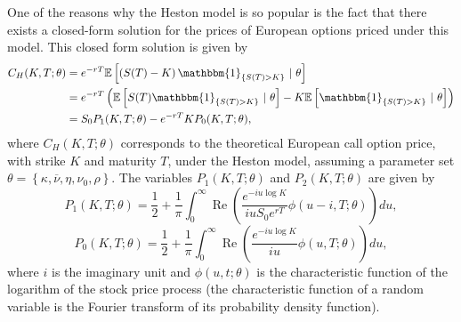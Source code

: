 One of the reasons why the Heston model is so popular is the fact that there exists a closed-form solution for the prices of European options priced under this model. This closed form solution is given by
\begin{equation}\label{CH}
\begin{split}
C_{H}(K,T;\theta)&=e^{-rT}\mathbb{E}\left[\left(S(T)-K\right)\mathbbm{1}_{\left\{S(T)>K\right\}}\ \vert\ \theta\right]\\
&=e^{-rT}\left(\mathbb{E}\left[S(T)\mathbbm{1}_{\left\{S(T)>K\right\}}\ \vert\ \theta\right]-K\mathbb{E}\left[\mathbbm{1}_{\left\{S(T)>K\right\}}\ \vert\ \theta\right]\right)\\
&=S_0P_1(K,T;\theta)-e^{-rT}KP_0(K,T;\theta),
\end{split}
\end{equation}
\noindent where $C_{H}(K,T;\theta)$ corresponds to the theoretical European call option price, with strike $K$ and maturity $T$, under the Heston model, assuming a parameter set $\theta=\left\{\kappa,\overline{\nu},\eta,\nu_0,\rho\right\}$. The variables $P_1(K,T;\theta)$ and $P_2(K,T;\theta)$ are given by
\begin{equation}\label{P1}
P_1(K,T;\theta)=\frac{1}{2}+\frac{1}{\pi}\int_0^\infty\operatorname{Re}\left(\frac{e^{-iu\log K}}{iuS_0e^{rT}}\phi(u-i,T;\theta)\right)du,
\end{equation}
\begin{equation}\label{P2}
P_0(K,T;\theta)=\frac{1}{2}+\frac{1}{\pi}\int_0^\infty\operatorname{Re}\left(\frac{e^{-iu\log K}}{iu}\phi(u,T;\theta)\right)du,
\end{equation}
\noindent where $i$ is the imaginary unit and $\phi(u,t;\theta)$ is the characteristic function of the logarithm of the stock price process (the characteristic function of a random variable is the Fourier transform of its probability density function).


